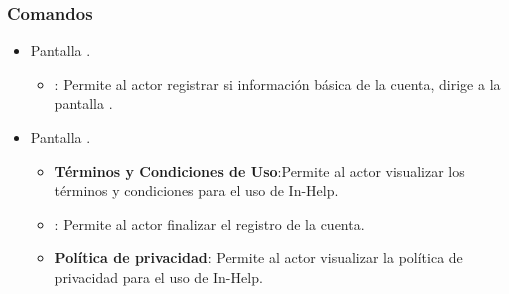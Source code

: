 \subsubsection{Comandos}
    \begin{itemize}
    	
    	\item Pantalla .
    	
    	\begin{itemize}
    		\item {}: Permite al actor registrar si información básica de la cuenta, dirige a la pantalla .
    	\end{itemize}
    
		\item Pantalla .
		
		\begin{itemize}
			\item \textbf{Términos y Condiciones de Uso}:Permite al actor visualizar los términos y condiciones para el uso de In-Help.
			\item {}:  Permite al actor finalizar el registro de la cuenta.
			\item \textbf{Política de privacidad}: Permite al actor visualizar la política de privacidad para el uso de In-Help.
		\end{itemize}
    \end{itemize}
